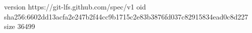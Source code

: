 version https://git-lfs.github.com/spec/v1
oid sha256:6602dd13acfa2e247b2f44cc9b1715c2e83b3876fd037c82915834ead0c8d227
size 36499
